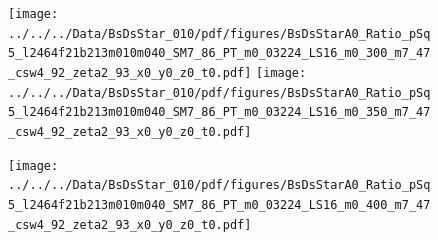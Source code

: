 \documentclass[a4paper,10pt]{article}
\begin{document}
\clearpage
\begin{figure}[p]
 \texttt{[image: ../../../Data/BsDsStar\_010/pdf/figures/BsDsStarA0\_Ratio\_pSq5\_l2464f21b213m010m040\_SM7\_86\_PT\_m0\_03224\_LS16\_m0\_300\_m7\_47\_csw4\_92\_zeta2\_93\_x0\_y0\_z0\_t0.pdf]} 
 \texttt{[image: ../../../Data/BsDsStar\_010/pdf/figures/BsDsStarA0\_Ratio\_pSq5\_l2464f21b213m010m040\_SM7\_86\_PT\_m0\_03224\_LS16\_m0\_350\_m7\_47\_csw4\_92\_zeta2\_93\_x0\_y0\_z0\_t0.pdf]} 
 \end{figure}
\begin{figure}[p]
 \texttt{[image: ../../../Data/BsDsStar\_010/pdf/figures/BsDsStarA0\_Ratio\_pSq5\_l2464f21b213m010m040\_SM7\_86\_PT\_m0\_03224\_LS16\_m0\_400\_m7\_47\_csw4\_92\_zeta2\_93\_x0\_y0\_z0\_t0.pdf]} 
 \end{figure}
\clearpage
\end{document}
